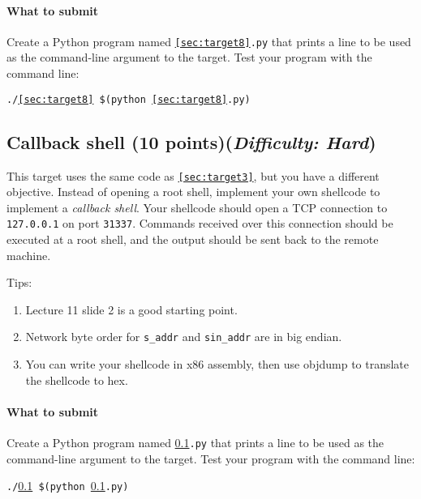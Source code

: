 \documentclass[letterpaper,12pt]{report}
\begin{document}
{\begin{enumerate}
\end{enumerate}

\paragraph{What to submit}
Create a Python program named \texttt{\ref{sec:target8}.py} that prints a line to be used as the command-line argument to the target.  Test your program with the command line:

\smallskip

\quad\texttt{./\ref{sec:target8} \$(python \ref{sec:target8}.py)}

\subsection{Callback shell (10 points)\hfill\rm\normalsize (\emph{Difficulty: Hard})}
\label{sec:target9}

This target uses the same code as \texttt{\ref{sec:target3}}, but you have a different objective.  Instead of opening a root shell, implement your own shellcode to implement a \emph{callback shell}.  Your shellcode should open a TCP connection to \texttt{127.0.0.1} on port \texttt{31337}.  Commands received over this connection should be executed at a root shell, and the output should be sent back to the remote machine.

\smallskip

Tips:
\begin{enumerate}
\item Lecture 11 slide 2 is a good starting point.
\item Network byte order for \texttt{s\_addr} and \texttt{sin\_addr} are in big endian.
\item You can write your shellcode in x86 assembly, then use objdump to translate the shellcode to hex.

\end{enumerate}

\paragraph{What to submit}
Create a Python program named \texttt{\ref{sec:target9}.py} that prints a line to be used as the command-line argument to the target.  Test your program with the command line:

\smallskip

\quad\texttt{./\ref{sec:target9} \$(python \ref{sec:target9}.py)}

}
\end{document}
